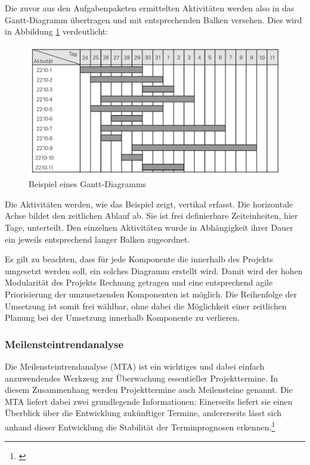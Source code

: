 Die zuvor aus den Aufgabenpaketen ermittelten Aktivitäten werden also in das Gantt-Diagramm übertragen und mit entsprechenden Balken versehen. Dies wird in Abbildung \ref{fig_beispiel_gantt_diagramm} verdeutlicht:

\begin{figure}[h!]
	\centering
	\includegraphics[width=\textwidth]
	{kapitel/gruppe4_2/bilder/beispiel_gantt_diagramm}
	\caption{Beispiel eines Gantt-Diagramms}
	\label{fig_beispiel_gantt_diagramm}
\end{figure}

Die Aktivitäten werden, wie das Beispiel zeigt, vertikal erfasst. Die horizontale Achse bildet den zeitlichen Ablauf ab. Sie ist frei definierbare Zeiteinheiten, hier Tage, unterteilt. Den einzelnen Aktivitäten wurde in Abhängigkeit ihrer Dauer ein jeweils entsprechend langer Balken zugeordnet.

Es gilt zu beachten, dass für jede Komponente die innerhalb des Projekts umgesetzt werden soll, ein solches Diagramm erstellt wird. Damit wird der hohen Modularität des Projekts Rechnung getragen und eine entsprechend agile Priorisierung der umzusetzenden Komponenten ist möglich. Die Reihenfolge der Umsetzung ist somit frei wählbar, ohne dabei die Möglichkeit einer zeitlichen Planung bei der Umsetzung innerhalb Komponente zu verlieren.

\subsubsection{Meilensteintrendanalyse}
Die Meilensteintrendanalyse (MTA) ist ein wichtiges und dabei einfach anzuwendendes Werkzeug zur Überwachung essentieller Projekttermine. In diesem Zusammenhang werden Projekttermine auch Meilensteine genannt. Die MTA liefert dabei zwei grundlegende Informationen: Einerseits liefert sie einen Überblick über die Entwicklung zukünftiger Termine, andererseits lässt sich anhand dieser Entwicklung die Stabilität der Terminprognosen erkennen.\footnote{\cite{gadatsch_masterkurs_2014}}

